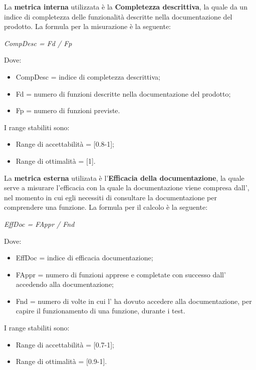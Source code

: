 \begin{itemize}
      La \textbf{metrica interna} utilizzata è la \textbf{Completezza descrittiva},
      la quale da un indice di completezza delle funzionalità descritte nella documentazione del prodotto.
      La formula per la misurazione è la seguente:
      \begin{center}
        \emph{CompDesc = Fd / Fp}
      \end{center}
      Dove:
      \begin{itemize}
        \item CompDesc = indice di completezza descrittiva;
        \item Fd = numero di funzioni descritte nella documentazione del prodotto;
        \item Fp = numero di funzioni previste.
      \end{itemize}
      I range stabiliti sono:
      \begin{itemize}
        \item Range di accettabilità = [0.8-1];
        \item Range di ottimalità = [1].
      \end{itemize}
      La \textbf{metrica esterna} utilizata è l'\textbf{Efficacia della documentazione}, la quale serve a misurare l'efficacia con la quale la documentazione viene compresa dall',
      nel momento in cui egli necessiti di consultare la documentazione per comprendere una funzione.
      La formula per il calcolo è la seguente:
      \begin{center}
        \emph{EffDoc = FAppr / Fnd}
      \end{center}
      Dove:
      \begin{itemize}
        \item EffDoc = indice di efficacia documentazione;
        \item FAppr = numero di funzioni apprese e completate con successo dall' accedendo alla documentazione;
        \item Fnd = numero di volte in cui l' ha dovuto accedere alla documentazione, per capire il funzionamento di una funzione, durante i test.
      \end{itemize}
      I range stabiliti sono:
      \begin{itemize}
        \item Range di accettabilità = [0.7-1];
        \item Range di ottimalità = [0.9-1].
      \end{itemize}

\end{itemize}
